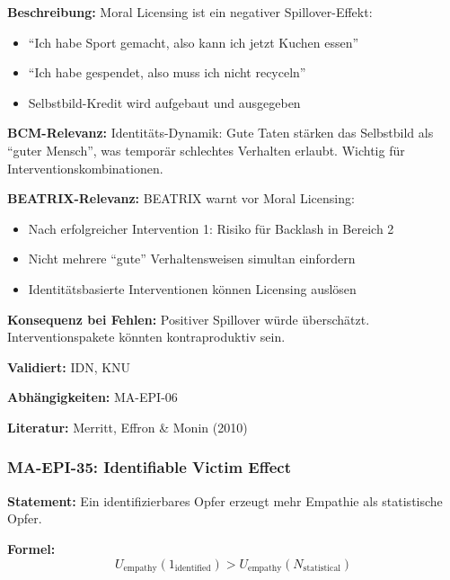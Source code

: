 \textbf{Beschreibung:}
Moral Licensing ist ein negativer Spillover-Effekt:
\begin{itemize}
    \item ``Ich habe Sport gemacht, also kann ich jetzt Kuchen essen''
    \item ``Ich habe gespendet, also muss ich nicht recyceln''
    \item Selbstbild-Kredit wird aufgebaut und ausgegeben
\end{itemize}

\textbf{BCM-Relevanz:}
Identitäts-Dynamik: Gute Taten stärken das Selbstbild als ``guter Mensch'', was temporär schlechtes Verhalten erlaubt. Wichtig für Interventionskombinationen.

\textbf{BEATRIX-Relevanz:}
BEATRIX warnt vor Moral Licensing:
\begin{itemize}
    \item Nach erfolgreicher Intervention 1: Risiko für Backlash in Bereich 2
    \item Nicht mehrere ``gute'' Verhaltensweisen simultan einfordern
    \item Identitätsbasierte Interventionen können Licensing auslösen
\end{itemize}

\textbf{Konsequenz bei Fehlen:}
Positiver Spillover würde überschätzt. Interventionspakete könnten kontraproduktiv sein.

\textbf{Validiert:} IDN, KNU

\textbf{Abhängigkeiten:} MA-EPI-06

\textbf{Literatur:} Merritt, Effron \& Monin (2010)


\subsubsection*{MA-EPI-35: Identifiable Victim Effect}

\textbf{Statement:} Ein identifizierbares Opfer erzeugt mehr Empathie als statistische Opfer.

\textbf{Formel:}
\begin{equation}
U_{\text{empathy}}(1_{\text{identified}}) > U_{\text{empathy}}(N_{\text{statistical}})
\end{equation}


